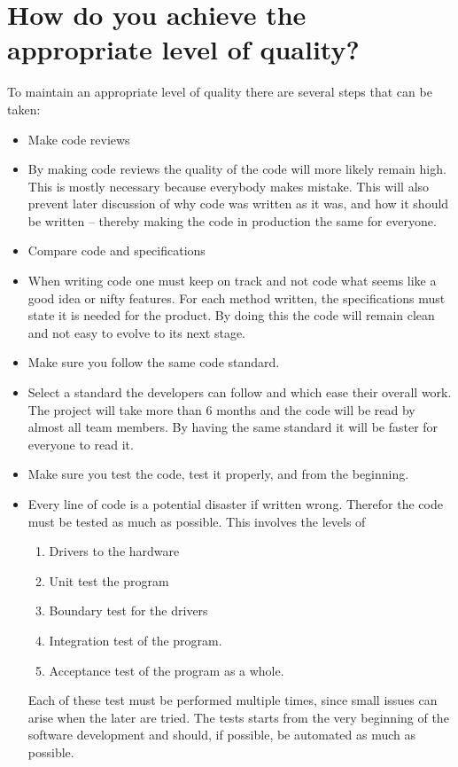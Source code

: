 \documentclass[Main]{subfiles}
\begin{document}
\section{How do you achieve the appropriate level of quality?}

To maintain an appropriate level of quality there are several steps that can be taken:

\begin{itemize}
	\item Make code reviews
	\item[] By making code reviews the quality of the code will more likely remain high.
	This is mostly necessary because everybody makes mistake.
	This will also prevent later discussion of why code was written as it was, and how it should be written -- thereby making the code in production the same for everyone.

	\item Compare code and specifications
	\item[] When writing code one must keep on track and not code what seems like a good idea or nifty features.
	For each method written, the specifications must state it is needed for the product.
	By doing this the code will remain clean and not easy to evolve to its next stage.


	\item Make sure you follow the same code standard.
	\item[] Select a standard the developers can follow and which ease their overall work. 
	The project will take more than 6 months and the code will be read by almost all team members.
	By having the same standard it will be faster for everyone to read it.

	\item Make sure you test the code, test it properly, and from the beginning.
	\item[] Every line of code is a potential disaster if written wrong.
	Therefor the code must be tested as much as possible. 
	This involves the levels of
	\begin{enumerate}
		\item Drivers to the hardware
		\item Unit test the program
		\item Boundary test for the drivers
		\item Integration test of the program.
		\item Acceptance test of the program as a whole.
	\end{enumerate}
	Each of these test must be performed multiple times, since small issues can arise when the later are tried.
	The tests starts from the very beginning of the software development and should, if possible, be automated as much as possible.
	
\end{itemize}
\end{document}
